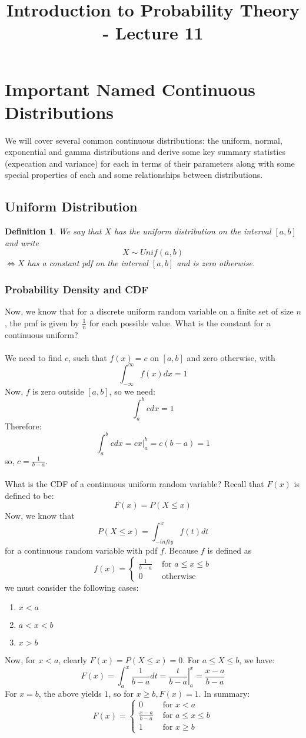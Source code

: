 \documentclass[12pt]{article} %
\date{}
\title{Introduction to Probability Theory - Lecture 11}
\newtheorem{defn}{Definition}
\begin{document}
\maketitle

\section{Important Named Continuous Distributions}
We will cover several common continuous distributions: the uniform, normal, exponential and gamma distributions and derive some key summary statistics (expecation and variance) for each in terms of their parameters along with some special properties of each and some relationships between distributions.
\subsection{Uniform Distribution}
\begin{defn}
We say that $X$ has the \emph{uniform distribution on the interval $[a,b]$} and write
$$X\sim Unif(a,b)$$
$\iff X$ has a constant pdf on the interval $[a,b]$ and is zero otherwise. 
\end{defn}
\subsubsection{Probability Density and CDF}
Now, we know that for a discrete uniform random variable on a finite set of size $n$, the pmf is given by $\frac1n$ for each possible value. What is the constant for a continuous uniform?\\\\
We need to find $c$, such that $f(x) = c$ on $[a,b]$ and zero otherwise, with 
$$\int_{-\infty}^{\infty} f(x) dx = 1 $$
Now, $f$ is zero outside $[a,b]$, so we need:
$$\int_a^b c dx = 1$$
Therefore:
$$\int_a^b c dx = cx\rvert_a^b = c(b-a) = 1$$
so, $c=\frac{1}{b-a}$.\\\\
What is the CDF of a continuous uniform random variable? Recall that $F(x)$ is defined to be:
$$F(x) = P(X\leq x)$$
Now, we know that 
$$P(X\leq x) = \int_{-infty}^{x} f(t) dt$$
for a continuous random variable with pdf $f$. Because $f$ is defined as
$$f(x) = \left\{\begin{matrix}
\frac1{b-a} & \textrm { for } a\leq x\leq b\\
0 & \textrm { otherwise}
\end{matrix}\right.$$
we must consider the following cases:
\begin{enumerate}
\item $x<a$
\item $a<x<b$
\item $x>b$
\end{enumerate}
Now, for $x<a$, clearly $F(x) = P(X\leq x) = 0$. For $a\leq X \leq b$, we have:
$$F(x) = \int_a^x \frac1{b-a} dt = \left.\frac t{b-a}\right\rvert_a^x = \frac{x-a}{b-a}$$  
For $x=b$, the above yields $1$, so for $x\geq b, F(x) =1$. In summary:
$$F(x) = \left\{\begin{matrix}
0 & \textrm{ for } x<a\\
\frac{x-a}{b-a}& \textrm{ for } a\leq x\leq b\\
1 & \textrm{ for } x\geq b 
\end{matrix}\right.$$
\end{document}
